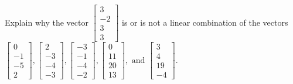 \documentclass{article}
\begin{document}
\begin{exerciseStatement}
    Explain why the vector \(\left[\begin{array}{c}
3 \\
-2 \\
3 \\
3
\end{array}\right]\)  is or is not a linear
combination of the vectors \(\left[\begin{array}{c}
0 \\
-1 \\
-5 \\
2
\end{array}\right] , \left[\begin{array}{c}
2 \\
-3 \\
-4 \\
-3
\end{array}\right] , \left[\begin{array}{c}
-3 \\
-1 \\
-4 \\
-2
\end{array}\right] , \left[\begin{array}{c}
0 \\
11 \\
20 \\
13
\end{array}\right] , \text{ and } \left[\begin{array}{c}
3 \\
4 \\
19 \\
-4
\end{array}\right]\).



  
\end{exerciseStatement}
\end{document}
